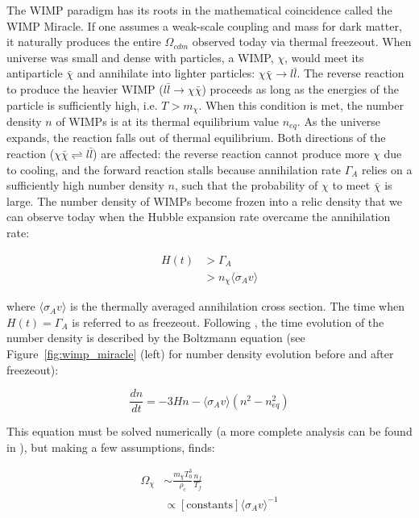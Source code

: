 The \ac{WIMP} paradigm has its roots in the mathematical coincidence called the \ac{WIMP} Miracle. If one assumes a weak-scale coupling and mass for dark matter, it naturally produces the entire $\Omega_{cdm}$ observed today via thermal freezeout. When universe was small and dense with particles, a \ac{WIMP}, $\chi$, would meet its antiparticle $\bar{\chi}$ and annihilate into lighter particles: $\chi \bar{\chi} \longrightarrow l \bar{l}$. The reverse reaction to produce the heavier \ac{WIMP} ($ l \bar{l} \longrightarrow \chi \bar{\chi} $) proceeds as long as the energies of the particle is sufficiently high, i.e. $T > m_{\chi}$. When this condition is met, the number density $n$ of \ac{WIMP}s is at its thermal equilibrium value $n_{eq}$. As the universe expands, the reaction falls out of thermal equilibrium. Both directions of the reaction ($\chi \bar{\chi} \rightleftharpoons l \bar{l}$) are affected: the reverse reaction cannot produce more $\chi$ due to cooling, and the forward reaction stalls because annihilation rate $\Gamma_{A}$ relies on a sufficiently high number density $n$, such that the probability of $\chi$ to meet $\bar{\chi}$ is large. The number density of \ac{WIMP}s become frozen into a relic density that we can observe today when the Hubble expansion rate overcame the annihilation rate:

\begin{equation}
\begin{split}
H(t) &> \Gamma_{A} \\
 &> n_{\chi} \langle \sigma_{A} v \rangle
\end{split}
\end{equation}

where $\langle \sigma_{A} v \rangle$ is the thermally averaged annihilation cross section. The time when $H(t) = \Gamma_{A}$ is referred to as freezeout. Following \cite{Feng2010}, the time evolution of the number density is described by the Boltzmann equation (see Figure~\ref{fig:wimp_miracle} (left) for number density evolution before and after freezeout):

\begin{equation}
\frac{dn}{dt} = -3 H n - \langle \sigma_{A}v \rangle (n^{2} - n_{eq}^{2} )
\end{equation}

This equation must be solved numerically (a more complete analysis can be found in \cite{Lisanti2016}), but making a few assumptions, \cite{Feng2010} finds:

\begin{equation}
\begin{split}
\Omega_{\chi} &\sim \frac{m_{\chi} T_{0}^{3}}{ \rho_{c}} \frac{n_{f}}{T_{f}} \\ %
&\propto [\mathrm{constants}] \langle \sigma_{A}v \rangle^{-1} 
\end{split}
\end{equation}

